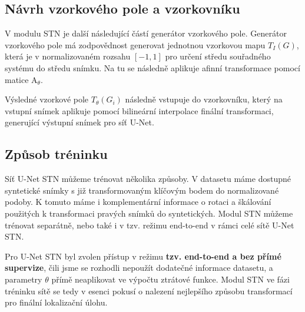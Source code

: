 \subsection{Návrh vzorkového pole a vzorkovníku}

V modulu STN je další následující částí generátor vzorkového pole. Generátor vzorkového pole má zodpovědnost generovat jednotnou vzorkovou mapu $T_{I}(G)$, která je v normalizovaném rozsahu $[-1, 1]$ pro určení středu souřadného systému do středu snímku. Na tu se následně aplikuje afinní transformace pomocí matice $\displaystyle \mathrm {A}_\theta$. 

Výsledné vzorkové pole $T_{\theta}(G_i)$ následně vstupuje do vzorkovníku, který na vstupní snímek aplikuje pomocí bilineární interpolace finální transformaci, generující výstupní snímek pro síť U-Net.

\subsection{Způsob tréninku}

Síť U-Net STN můžeme trénovat několika způsoby. V datasetu máme dostupné syntetické snímky s již transformovaným klíčovým bodem do normalizované podoby. K tomuto máme i komplementární informace o rotaci a škálování použitých k transformaci pravých snímků do syntetických. Modul STN můžeme trénovat separátně, nebo také i v tzv. režimu end-to-end v rámci celé sítě U-Net STN.

Pro U-Net STN byl zvolen přístup v režimu \textbf{tzv. end-to-end a bez přímé supervize}, čili jsme se rozhodli nepoužít dodatečné informace datasetu, a parametry $\theta$ přímě neaplikovat ve výpočtu ztrátové funkce. Modul STN ve fázi tréninku sítě se tedy v esenci pokusí o nalezení nejlepšího způsobu transformací pro finální lokalizační úlohu.

\endinput